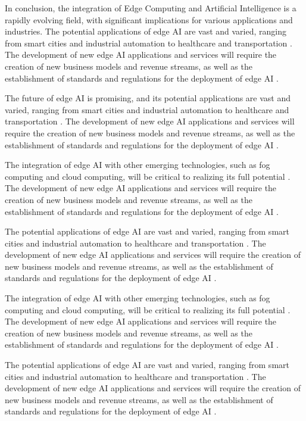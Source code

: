 \documentclass[11pt,a4paper]{article}
\begin{document}
In conclusion, the integration of Edge Computing and Artificial Intelligence is a rapidly evolving field, with significant implications for various applications and industries. The potential applications of edge AI are vast and varied, ranging from smart cities and industrial automation to healthcare and transportation \cite{arxiv:2502.15775}. The development of new edge AI applications and services will require the creation of new business models and revenue streams, as well as the establishment of standards and regulations for the deployment of edge AI \cite{arxiv:2403.15665}. 

The future of edge AI is promising, and its potential applications are vast and varied, ranging from smart cities and industrial automation to healthcare and transportation \cite{arxiv:2402.13056}. The development of new edge AI applications and services will require the creation of new business models and revenue streams, as well as the establishment of standards and regulations for the deployment of edge AI \cite{arxiv:2309.05416}. 

The integration of edge AI with other emerging technologies, such as fog computing and cloud computing, will be critical to realizing its full potential \cite{arxiv:2404.13411}. The development of new edge AI applications and services will require the creation of new business models and revenue streams, as well as the establishment of standards and regulations for the deployment of edge AI \cite{arxiv:1906.08452}. 

The potential applications of edge AI are vast and varied, ranging from smart cities and industrial automation to healthcare and transportation \cite{arxiv:2201.00242}. The development of new edge AI applications and services will require the creation of new business models and revenue streams, as well as the establishment of standards and regulations for the deployment of edge AI \cite{arxiv:1909.08747}. 

The integration of edge AI with other emerging technologies, such as fog computing and cloud computing, will be critical to realizing its full potential \cite{arxiv:2111.10076}. The development of new edge AI applications and services will require the creation of new business models and revenue streams, as well as the establishment of standards and regulations for the deployment of edge AI \cite{arxiv:2106.10063}. 

The potential applications of edge AI are vast and varied, ranging from smart cities and industrial automation to healthcare and transportation \cite{arxiv:2101.10417}. The development of new edge AI applications and services will require the creation of new business models and revenue streams, as well as the establishment of standards and regulations for the deployment of edge AI \cite{arxiv:2105.03559}. 
\end{document}
